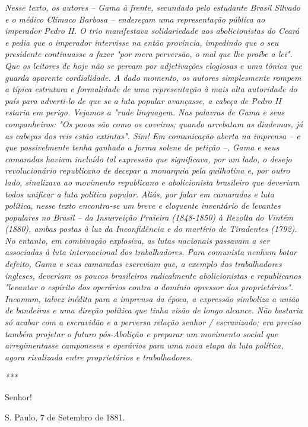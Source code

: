 \emph{Nesse texto, os autores -- Gama à frente, secundado pelo estudante
Brasil Silvado e o médico Clímaco Barbosa -- endereçam uma representação
pública ao imperador Pedro II. O trio manifestava solidariedade aos
abolicionistas do Ceará e pedia que o imperador intervisse na então
província, impedindo que o seu presidente continuasse a fazer "por mera
perversão, o mal que lhe proíbe a lei". Que os leitores de hoje não se
percam por adjetivações elogiosas e uma tônica que guarda aparente
cordialidade. A dado momento, os autores simplesmente rompem a típica
estrutura e formalidade de uma representação à mais alta autoridade do
país para adverti-lo de que se a luta popular avançasse, a cabeça de
Pedro II estaria em perigo. Vejamos a "rude linguagem. Nas palavras de
Gama e seus companheiros: "Os povos são como os coveiros; quando
arrebatam as diademas, já as cabeças dos reis estão extintas". Sim! Em
comunicação aberta na imprensa -- e que possivelmente tenha ganhado a
forma solene de petição --, Gama e seus camaradas haviam incluído tal
expressão que significava, por um lado, o desejo revolucionário
republicano de decepar a monarquia pela guilhotina e, por outro lado,
sinalizava ao movimento republicano e abolicionista brasileiro que
deveriam todos unificar a luta política popular. Aliás, por falar em
camaradas e luta política, nesse texto encontra-se um breve e eloquente
inventário de levantes populares no Brasil -- da Insurreição Praieira
(1848-1850) à Revolta do Vintém (1880), ambas postas à luz da
Inconfidência e do martírio de Tiradentes (1792). No entanto, em
combinação explosiva, as lutas nacionais passavam a ser associadas à
luta internacional dos trabalhadores. Para comunista nenhum botar
defeito, Gama e seus camaradas escreviam que, a exemplo dos
trabalhadores ingleses, deveriam os poucos brasileiros radicalmente
abolicionistas e republicanos "levantar o espírito dos operários contra
o domínio opressor dos proprietários". Incomum, talvez inédita para a
imprensa da época, a expressão simboliza a união de bandeiras e uma
direção política que tinha visão de longo alcance. Não bastaria só
acabar com a escravidão e a perversa relação senhor / escravizado; era
preciso também projetar o futuro pós-Abolição e preparar um movimento
social que arregimentasse camponeses e operários para uma nova etapa da
luta política, agora rivalizada entre proprietários e trabalhadores. }

\emph{***}

Senhor!

S. Paulo, 7 de Setembro de 1881.

